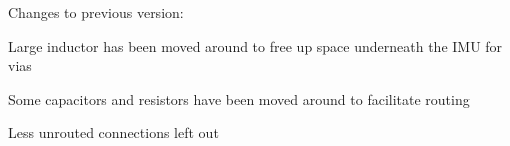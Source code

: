 Changes to previous version\+:


\begin{DoxyItemize}
\item Large inductor has been moved around to free up space underneath the I\+MU for vias
\item Some capacitors and resistors have been moved around to facilitate routing
\item Less unrouted connections left out 
\end{DoxyItemize}